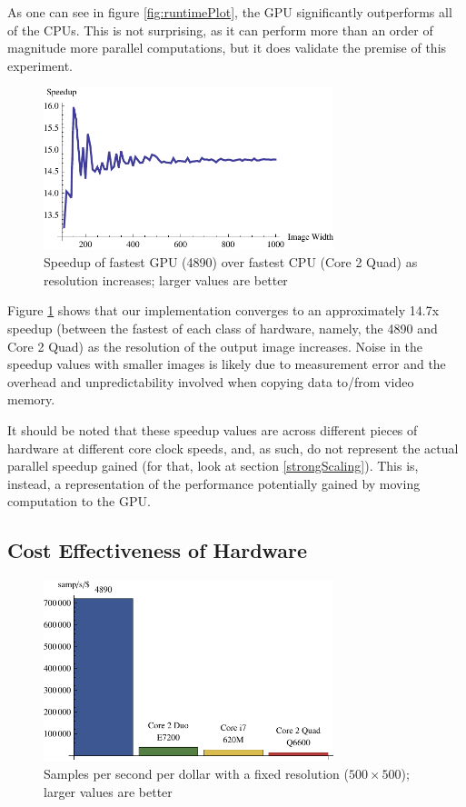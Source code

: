 \documentclass{acmsiggraph}
\begin{document}
As one can see in figure \ref{fig:runtimePlot}, the GPU significantly outperforms all of the CPUs. This is not surprising, as it can perform more than an order of magnitude more parallel computations, but it does validate the premise of this experiment.

\begin{figure}
    \includegraphics[width=84.5mm]{speedupPlot.pdf}
    \caption{Speedup of fastest GPU (4890) over fastest CPU (Core 2 Quad) as resolution increases; larger values are better}
    \label{fig:speedupPlot}
\end{figure}

Figure \ref{fig:speedupPlot} shows that our implementation converges to an approximately 14.7x speedup (between the fastest of each class of hardware, namely, the 4890 and Core 2 Quad) as the resolution of the output image increases. Noise in the speedup values with smaller images is likely due to measurement error and the overhead and unpredictability involved when copying data to/from video memory.

It should be noted that these speedup values are across different pieces of hardware at different core clock speeds, and, as such, do not represent the actual parallel speedup gained (for that, look at section \ref{strongScaling}). This is, instead, a representation of the performance potentially gained by moving computation to the GPU.

\subsection{Cost Effectiveness of Hardware}

\begin{figure}
    \includegraphics[width=84.5mm]{dollarPlot.pdf}
    \caption{Samples per second per dollar with a fixed resolution ($500\times500$); larger values are better}
    \label{fig:costEffectiveness}
\end{figure}
\end{document}

